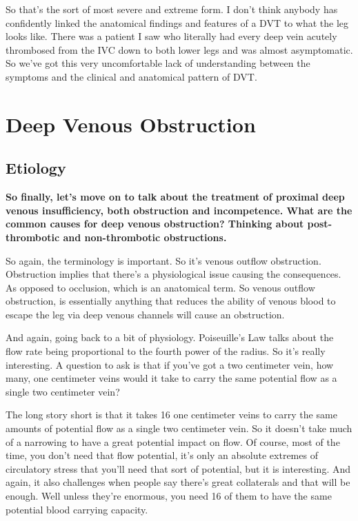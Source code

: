 \documentclass[
]{book}
\begin{document}
So that's the sort of most severe and extreme form. I don't think
anybody has confidently linked the anatomical findings and features of a
DVT to what the leg looks like. There was a patient I saw who literally
had every deep vein acutely thrombosed from the IVC down to both lower
legs and was almost asymptomatic. So we've got this very uncomfortable
lack of understanding between the symptoms and the clinical and
anatomical pattern of DVT.

\hypertarget{deep-venous-obstruction}{%
\section{Deep Venous Obstruction}\label{deep-venous-obstruction}}

\hypertarget{etiology-11}{%
\subsection{Etiology}\label{etiology-11}}

\textbf{So finally, let's move on to talk about the treatment of proximal deep
venous insufficiency, both obstruction and incompetence. What are the
common causes for deep venous obstruction? Thinking about
post-thrombotic and non-thrombotic obstructions.}

So again, the terminology is important. So it's venous outflow
obstruction. Obstruction implies that there's a physiological issue
causing the consequences. As opposed to occlusion, which is an
anatomical term. So venous outflow obstruction, is essentially anything
that reduces the ability of venous blood to escape the leg via deep
venous channels will cause an obstruction.

And again, going back to a bit of physiology. Poiseuille's Law talks
about the flow rate being proportional to the fourth power of the
radius. So it's really interesting. A question to ask is that if you've
got a two centimeter vein, how many, one centimeter veins would it take
to carry the same potential flow as a single two centimeter vein?

The long story short is that it takes 16 one centimeter veins to carry
the same amounts of potential flow as a single two centimeter vein. So
it doesn't take much of a narrowing to have a great potential impact on
flow. Of course, most of the time, you don't need that flow potential,
it's only an absolute extremes of circulatory stress that you'll need
that sort of potential, but it is interesting. And again, it also
challenges when people say there's great collaterals and that will be
enough. Well unless they're enormous, you need 16 of them to have the
same potential blood carrying capacity.
\end{document}
